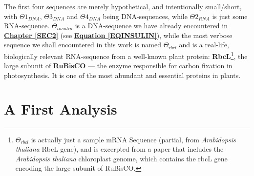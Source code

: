 \documentclass[a4paper, 18pt]{book} %
\begin{document}
The first four sequences are merely hypothetical, and intentionally small/short, with $\Theta1_{DNA}$, $\Theta3_{DNA}$ and $\Theta4_{DNA}$ being DNA-sequences, while $\Theta2_{RNA}$ is just some RNA-sequence. $\Theta_{insulin}$ is a DNA-sequence we have already encountered in \textbf{\hyperref[SEC2]{Chapter \ref{SEC2}}} (see \textbf{\hyperref[EQINSULIN]{Equation \ref{EQINSULIN}}}), while the most verbose sequence we shall encountered in this work is named $\Theta_{rbcl}$ and is a real-life, biologically relevant RNA-sequence from a well-known plant protein: \textbf{RbcL}\footnote{$\Theta_{rbcl}$ is actually just a sample mRNA Sequence (partial, from \textit{Arabidopsis thaliana} RbcL gene), and is excerpted from a paper that includes the \textit{Arabidopsis thaliana} chloroplast genome, which contains the rbcL gene encoding the large subunit of RuBisCO\cite{Sato1999ArabidopsisChloroplastGenome}.}, the large subunit of \textbf{RuBisCO} --- the enzyme responsible for carbon fixation in photosynthesis. It is one of the most abundant and essential proteins in plants\cite{copilot_dna_assistant}.

\section{A First Analysis}
\label{SECFANAL}
\end{document}
